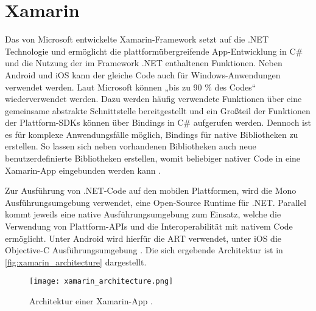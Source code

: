 \section{Xamarin}
\label{sec:Frameworks_Xamarin}

Das von Microsoft entwickelte Xamarin-Framework setzt auf die .NET Technologie und ermöglicht die plattformübergreifende App-Entwicklung in C\# und die Nutzung der im Framework .NET enthaltenen Funktionen.
Neben Android und iOS kann der gleiche Code auch für Windows-Anwendungen verwendet werden.
Laut Microsoft können „bis zu 90 \% des Codes“ \cite{Xamarin_Homepage} wiederverwendet werden.
Dazu werden häufig verwendete Funktionen über eine gemeinsame abstrakte Schnittstelle bereitgestellt und ein Großteil der Funktionen der Plattform-\acp{SDK} können über Bindings in C\# aufgerufen werden.
Dennoch ist es für komplexe Anwendungsfälle möglich, Bindings für native Bibliotheken zu erstellen.
So lassen sich neben vorhandenen Bibliotheken auch neue benutzerdefinierte Bibliotheken erstellen, womit beliebiger nativer Code in eine Xamarin-App eingebunden werden kann \cite{Xamarin_Android}.


Zur Ausführung von .NET-Code auf den mobilen Plattformen, wird die Mono Ausführungsumgebung verwendet, eine Open-Source Runtime für .NET.
Parallel kommt jeweils eine native Ausführungsumgebung zum Einsatz, welche die Verwendung von Plattform-\acp{API} und die Interoperabilität mit nativem Code ermöglicht.
Unter Android wird hierfür die \ac{ART} verwendet, unter iOS die Objective-C Ausführungsumgebung \cite{Xamarin_iOS,Xamarin_Android}.
Die sich ergebende Architektur ist in \autoref{fig:xamarin_architecture} dargestellt.
\begin{figure}[h]
    \centering
    \texttt{[image: xamarin\_architecture.png]}
    \caption{Architektur einer Xamarin-App \cite{Xamarin_Homepage}.}
    \label{fig:xamarin_architecture}
\end{figure}


